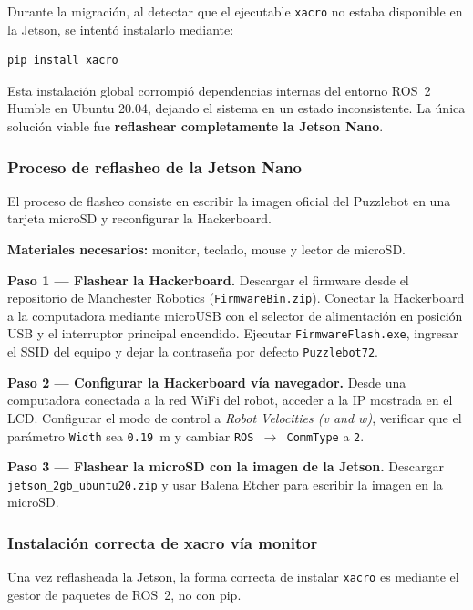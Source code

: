 \documentclass[conference]{IEEEtran}
\begin{document}
Durante la migración, al detectar que el ejecutable \texttt{xacro} no estaba
disponible en la Jetson, se intentó instalarlo mediante:

\begin{lstlisting}
pip install xacro
\end{lstlisting}

Esta instalación global corrompió dependencias internas del entorno ROS~2
Humble en Ubuntu 20.04, dejando el sistema en un estado inconsistente. La única
solución viable fue \textbf{reflashear completamente la Jetson Nano}.

\subsubsection{Proceso de reflasheo de la Jetson Nano}

El proceso de flasheo consiste en escribir la imagen oficial del Puzzlebot en
una tarjeta microSD y reconfigurar la Hackerboard.

\textbf{Materiales necesarios:} monitor, teclado, mouse y lector de microSD.

\textbf{Paso 1 — Flashear la Hackerboard.}
Descargar el firmware desde el repositorio de Manchester Robotics
(\texttt{FirmwareBin.zip}). Conectar la Hackerboard a la computadora mediante
microUSB con el selector de alimentación en posición USB y el interruptor
principal encendido. Ejecutar \texttt{FirmwareFlash.exe}, ingresar el SSID del
equipo y dejar la contraseña por defecto \texttt{Puzzlebot72}.

\textbf{Paso 2 — Configurar la Hackerboard vía navegador.}
Desde una computadora conectada a la red WiFi del robot, acceder a la IP
mostrada en el LCD. Configurar el modo de control a \textit{Robot Velocities
(v and w)}, verificar que el parámetro \texttt{Width} sea \texttt{0.19}~m y
cambiar \texttt{ROS~$\to$~CommType} a \texttt{2}.

\textbf{Paso 3 — Flashear la microSD con la imagen de la Jetson.}
Descargar \texttt{jetson\_2gb\_ubuntu20.zip} y usar Balena Etcher para
escribir la imagen en la microSD.

\subsubsection{Instalación correcta de xacro vía monitor}

Una vez reflasheada la Jetson, la forma correcta de instalar \texttt{xacro}
es mediante el gestor de paquetes de ROS~2, no con pip.
\end{document}
